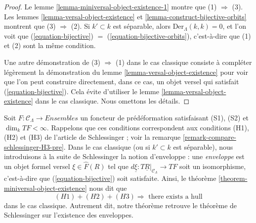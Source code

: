 \begin{proof}
Le lemme \ref{lemma-miniversal-object-existence-1} montre que
(1) $\Rightarrow$ (3). Les lemmes \ref{lemma-versal-object-existence} et
\ref{lemma-construct-bijective-orbits} montrent que
(3) $\Rightarrow$ (2). Si $k' \subset k$ est séparable, alors
$\text{Der}_\Lambda(k, k) = 0$, et l'on voit que
(\ref{equation-bijective}) $=$ (\ref{equation-bijective-orbits}),
c'est-à-dire que (1) et (2) sont la même condition.

\medskip\noindent
Une autre démonstration de (3) $\Rightarrow$ (1) dans le cas classique
consiste à compléter légèrement la démonstration du lemme
\ref{lemma-versal-object-existence} pour voir que l'on peut construire
directement, dans ce cas, un objet versel qui satisfait
(\ref{equation-bijective}). Cela évite d'utiliser le lemme
\ref{lemma-versal-object-existence} dans le cas classique. Nous omettons les
détails.
\end{proof}

\begin{remark}
\label{remark-compare-schlessinger-H3}
Soit $F : \mathcal{C}_\Lambda \to \textit{Ensembles}$ un foncteur de
prédéformation satisfaisant (S1), (S2) et $\dim_k TF < \infty$. Rappelons que
ces conditions correspondent aux conditions (H1), (H2) et (H3) de l'article
de Schlessinger ; voir la remarque
\ref{remark-compare-schlessinger-H3-pre}. Dans le cas classique (ou si
$k' \subset k$ est séparable), nous introduisons à la suite de Schlessinger
la notion d'enveloppe : une {\it enveloppe} est un objet formel versel
$\xi \in \widehat{F}(R)$ tel que
$d\underline{\xi} : T\underline{R}|_{\mathcal{C}_\Lambda} \to TF$
soit un isomorphisme, c'est-à-dire que (\ref{equation-bijective}) soit
satisfaite. Ainsi, le théorème \ref{theorem-miniversal-object-existence} nous
dit que
$$
(H1) + (H2) + (H3)
\Rightarrow
\text{ there exists a hull}
$$
dans le cas classique. Autrement dit, notre théorème retrouve le théorème de
Schlessinger sur l'existence des enveloppes.
\end{remark}


